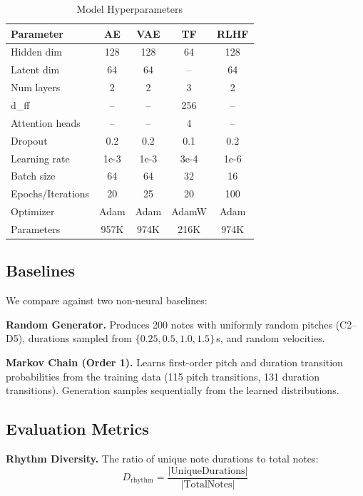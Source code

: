 \documentclass[conference]{IEEEtran}
\begin{document}
\begin{table}[ht]
\centering
\caption{Model Hyperparameters}
\label{tab:hyperparams}
\begin{tabular}{lcccc}
\toprule
\textbf{Parameter} & \textbf{AE} & \textbf{VAE} & \textbf{TF} & \textbf{RLHF} \\
\midrule
Hidden dim & 128 & 128 & 64 & 128 \\
Latent dim & 64 & 64 & -- & 64 \\
Num layers & 2 & 2 & 3 & 2 \\
d\_ff & -- & -- & 256 & -- \\
Attention heads & -- & -- & 4 & -- \\
Dropout & 0.2 & 0.2 & 0.1 & 0.2 \\
Learning rate & 1e-3 & 1e-3 & 3e-4 & 1e-6 \\
Batch size & 64 & 64 & 32 & 16 \\
Epochs/Iterations & 20 & 25 & 20 & 100 \\
Optimizer & Adam & Adam & AdamW & Adam \\
Parameters & 957K & 974K & 216K & 974K \\
\bottomrule
\end{tabular}
\end{table}

\subsection{Baselines}
We compare against two non-neural baselines:

\textbf{Random Generator.} Produces 200 notes with uniformly random pitches (C2--D5), durations sampled from $\{0.25, 0.5, 1.0, 1.5\}$\,s, and random velocities.

\textbf{Markov Chain (Order 1).} Learns first-order pitch and duration transition probabilities from the training data (115 pitch transitions, 131 duration transitions). Generation samples sequentially from the learned distributions.

\subsection{Evaluation Metrics}

\textbf{Rhythm Diversity.} The ratio of unique note durations to total notes:
\begin{equation}
    D_{\text{rhythm}} = \frac{|\text{UniqueDurations}|}{|\text{TotalNotes}|}
\end{equation}
\end{document}
